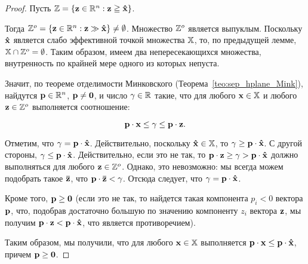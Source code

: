 \begin{proof}

Пусть $\mathbb{Z}=\{\mathbf{z}\in \mathbb{R}^n: \mathbf{z} \geqq \mathbf{\hat x}\}$.

Тогда $\mathbb{Z}^o=\{\mathbf{z} \in \mathbb{R}^n: \mathbf{z} \gg \mathbf{\hat x}\} \neq
\emptyset$. Множество $\mathbb{Z}^o$ является выпуклым. Поскольку
$\mathbf{\hat x}$ является слабо эффективной точкой множества $\mathbb{X}$,
то, по предыдущей лемме, $\mathbb{X} \cap \mathbb{Z}^o=\emptyset$. Таким
образом, имеем два непересекающихся множества, внутренность по
крайней мере одного из которых непуста.

Значит, по теореме отделимости Минковского
(Теорема~\ref{teo:sep_hplane_Mink}), найдутся $\mathbf{p} \in \mathbb{R}^n$,
$\mathbf{p}\neq \mathbf{0}$, и число $\gamma \in \mathbb{R}$ такие, что для любого
$\mathbf{x} \in \mathbb{X}$ и любого $\mathbf{z} \in \mathbb{Z}^o$ выполняется
соотношение:

\[
\mathbf{p} \cdot \mathbf{x} \leq \gamma \leq \mathbf{p} \cdot \mathbf{z}.
\]

Отметим, что $\gamma = \mathbf{p} \cdot \mathbf{\hat x}$. Действительно,
поскольку $\mathbf{\hat x} \in \mathbb{X}$, то $\gamma \geq \mathbf{p} \cdot
\mathbf{\hat x}$. С другой стороны, $\gamma \leq \mathbf{p} \cdot \mathbf{\hat
x}$. Действительно, если это не так, то $\mathbf{p} \cdot \mathbf{z}\geq
\gamma> \mathbf{p} \cdot \mathbf{\hat x}$ должно выполняться для любого
$\mathbf{z} \in \mathbb{Z}^o$. Однако, это невозможно: мы всегда можем
подобрать такое $\mathbf{\bar z}$, что $\mathbf{p}\cdot\mathbf{\bar z}<\gamma$.
Отсюда следует, что $\gamma = \mathbf{p} \cdot \mathbf{\hat x}$.

Кроме того, $\mathbf{p} \geq \mathbf{0}$ (если это не так, то найдется такая
компонента ${p_i < 0}$ вектора $\mathbf{p}$, что, подобрав достаточно
большую по значению компоненту $z_i$ вектора $\mathbf{z}$, мы получим
$\mathbf{p} \cdot \mathbf{z}<\mathbf{p} \cdot \mathbf{\hat x}$, что является
противоречием).

Таким образом, мы получили, что для любого $\mathbf{x} \in \mathbb{X}$
выполняется $\mathbf{p} \cdot \mathbf{x} \leq \mathbf{p} \cdot \mathbf{\hat x}$,
причем $\mathbf{p} \geq \mathbf{0}$.
\end{proof}

